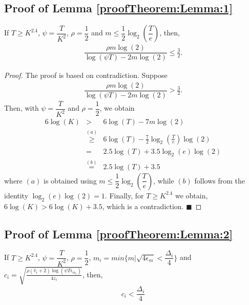
\subsection{Proof of Lemma \ref{proofTheorem:Lemma:1}} 

\label{App:Lemma:1}

\begin{customlem}{1}
If $T\geq K^{2.4}$, $\psi=\dfrac{T}{ K^2}$, $\rho=\dfrac{1}{2}$ and $m\leq \dfrac{1}{2} \log_2\left(\dfrac{T}{e}\right) $, then,
\begin{align*}
\dfrac{\rho m \log(2)}{\log(\psi T) - 2m\log( 2)} \leq \frac{3}{2}.
\end{align*}
\end{customlem}

\begin{proof}
The proof is based on contradiction. Suppose
\begin{eqnarray*}
\dfrac{\rho m \log(2)}{\log(\psi T) - 2m\log( 2)} > \frac{3}{2}.
\end{eqnarray*}
Then, with $\psi=\dfrac{T}{ K^2}$ and $\rho=\dfrac{1}{2}$, we obtain
\begin{eqnarray*}
6\log(K) 
&>& 6\log(T) - 7m\log(2) \\
&\overset{(a)}{\ge}& 6\log(T) - \frac{7}{2} \log_2\left(\frac{T}{e}\right) \log(2) \\
&=& 2.5\log(T) + 3.5 \log_2(e)\log(2)  \\
&\overset{(b)}{=}& 2.5\log(T) +3.5
\end{eqnarray*}
where $(a)$ is obtained using $m\leq \dfrac{1}{2} \log_2\left(\dfrac{T}{e}\right)$, while $(b)$ follows from the identity $\log_2(e)\log(2) =1$. Finally, for $T\ge K^{2.4}$ we obtain, $6\log(K)>6\log(K)+3.5$, which is a contradiction.
\hfill $\blacksquare$	
\end{proof}

\subsection{Proof of Lemma \ref{proofTheorem:Lemma:2}}
\label{App:Lemma:2}
\begin{customlem}{2}
If $T\geq K^{2.4}$, $\psi=\dfrac{T}{ K^2}$, $\rho =\dfrac{1}{2}$, $m_i = min\lbrace m|\sqrt{4\epsilon_{m} } < \dfrac{\Delta_i}{4} \rbrace $ and $c_{i} =\sqrt{\frac{\rho (\hat{v}_i + 2)\log (\psi T\epsilon_{m_{i}})}{4 z_i}}$, then, 
\begin{align*}
c_{i} < \dfrac{\Delta_i}{4}
\end{align*}

\end{customlem}

